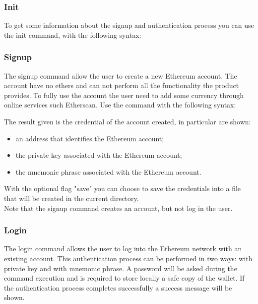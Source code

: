 \subsubsection{Init}
To get some information about the signup and authentication process you can use the init command, with the following syntax: 
\begin{center}
\end{center}

\subsubsection{Signup}
The signup command allow the user to create a new Ethereum account. The account have no ethers and can not perform all the functionality the product provides.
To fully use the account the user need to add some currency through online services such Etherscan.
Use the command with the following syntax: 

\begin{center}
\end{center} 

\noindent The result given is the credential of the account created, in particular are shown: 
\begin{itemize}
	\item an address that identifies the Ethereum account; 
	\item the private key associated with the Ethereum account; 
	\item the mnemonic phrase associated with the Ethereum account.
\end{itemize}
With the optional flag "save" you can choose to save the credentials into a file that will be created in the current directory. \\
Note that the signup command creates an account, but not log in the user. 

\subsubsection{Login}
The login command allows the user to log into the Ethereum network with an existing account.
This authentication process can be performed in two ways: with private key and with mnemonic phrase. 
A password will be asked during the command execution and is required to store locally a safe copy of the wallet. If the authentication process completes successfully a success message will be shown.

